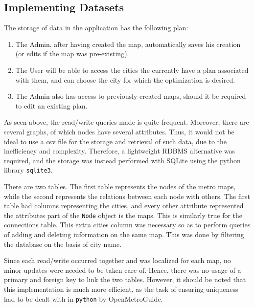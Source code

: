 \documentclass[fontsize=11pt]{article}
\begin{document}
    \subsection*{Implementing Datasets}
    The storage of data in the application has the following plan:

    \begin{enumerate}
        \item The Admin, after having created the map, automatically saves his creation (or edits if the map was pre-existing).

        \item The User will be able to access the cities the currently have a plan associated with them, and can choose the city for which the optimization is desired.

        \item The Admin also has access to previously created maps, should it be required to edit an existing plan.
    \end{enumerate}

    As seen above, the read/write queries made is quite frequent. Moreover, there are several graphs, of which nodes have several attributes. Thus, it would not be ideal to use a csv file for the storage and retrieval of such data, due to the inefficiency and complexity. Therefore, a lightweight RDBMS alternative was required, and the storage was instead performed with SQLite using the python library \texttt{sqlite3}.

    There are two tables. The first table represents the nodes of the metro maps, while the second represents the relations between each node with others. The first table had columns representing the cities, and every other attribute represented the attributes part of the \texttt{Node} object is the maps. This is similarly true for the connections table. This extra cities column was necessary so as to perform queries of adding and deleting information on the same map. This was done by filtering the database on the basis of city name.

    Since each read/write occurred together and was localized for each map,  no minor updates were needed to be taken care of. Hence, there was no usage of a primary and foreign key to link the two tables. However, it should be noted that this implementation is much more efficient, as the task of ensuring uniqueness had to be dealt with in \texttt{python} by OpenMetroGuide.
\end{document}

